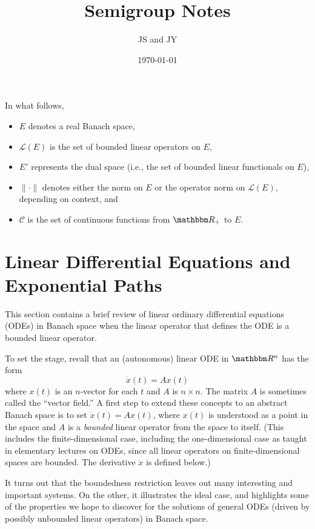 \documentclass[12pt, reqno]{amsart}
\newcommand{\1}{\mathbbm 1}
\newcommand{\cC}{\mathscr C}
\newcommand{\lL}{\mathcal L}
\newcommand{\RR}{\mathbbm R}
\theoremstyle{plain}
\theoremstyle{definition}
\begin{document}
\title{Semigroup Notes}

\author{JS and JY}

\date{\today}

\maketitle


In what follows, 
%
\begin{itemize}
    \item $E$ denotes a real Banach space,
    \item $\lL(E)$ is the set of bounded linear operators on $E$,
    \item $E'$ represents the dual space (i.e., the set of bounded linear
        functionals on $E$),
    \item $\| \cdot \|$ denotes either the norm on $E$ or the operator norm on
        $\lL(E)$, depending on context, and
    \item $\cC$ is the set of continuous functions from $\RR_+$ to $E$.
\end{itemize}

\section{Linear Differential Equations and Exponential Paths}

This section contains a brief review of linear ordinary differential equations
(ODEs) in Banach space when the linear operator that defines the ODE is a
bounded linear operator.

To set the stage, recall that an (autonomous) linear ODE in $\RR^n$ has the form
%
\begin{equation*}
    \dot x(t) = A x(t)
\end{equation*}
%
where $x(t)$ is an $n$-vector for each $t$ and $A$ is $n \times n$.  The matrix
$A$ is sometimes called the ``vector field.''  A first step to extend these
concepts to an abstract Banach space is to set $\dot x(t) = A x(t)$, where
$x(t)$ is understood as a point in the space and $A$ is a \emph{bounded} linear
operator from the space to itself.  (This includes the finite-dimensional case,
including the one-dimensional case as taught in elementary lectures on ODEs,
since all linear operators on finite-dimensional spaces are bounded.  The
derivative $\dot x$ is defined below.)

It turns out that the boundedness restriction leaves out many interesting and
important systems.  On the other, it illustrates the ideal case, and
highlights some of the properties we hope to discover for the solutions of
general ODEs (driven by possibly unbounded linear operators) in Banach space.  
\end{document}
